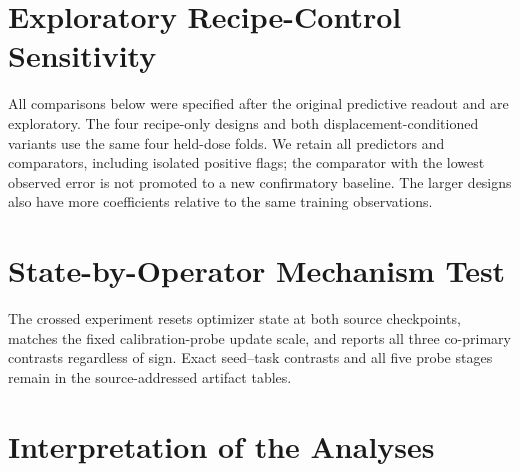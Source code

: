 \documentclass[11pt]{article}
\begin{document}
\DimensionUtilizationAppendixTable

\section{Exploratory Recipe-Control Sensitivity}

All comparisons below were specified after the original predictive readout and are exploratory.
The four recipe-only designs and both displacement-conditioned variants use the same four
held-dose folds. We retain all predictors and comparators, including isolated positive flags;
the comparator with the lowest observed error is not promoted to a new confirmatory baseline.
The larger designs also have more coefficients relative to the same training observations.

\WeightRecipeSensitivityTable

\FunctionalRecipeSensitivityTable

\section{State-by-Operator Mechanism Test}

The crossed experiment resets optimizer state at both source checkpoints, matches the fixed
calibration-probe update scale, and reports all three co-primary contrasts regardless of sign.
Exact seed--task contrasts and all five probe stages remain in the source-addressed artifact tables.

\StateOperatorAppendixTable

\section{Interpretation of the Analyses}
\end{document}
